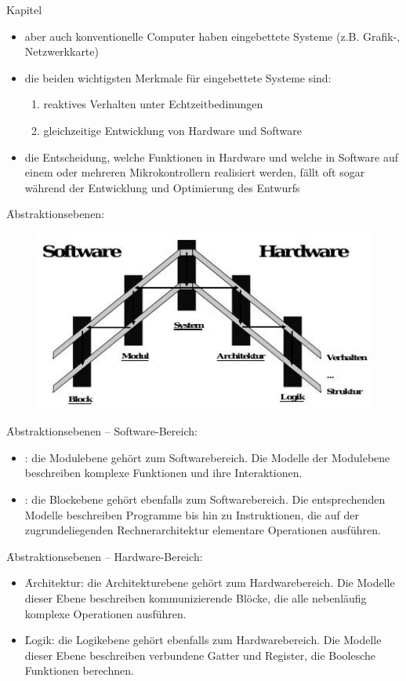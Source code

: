 \begin{chapter}{Kapitel}
\begin{itemize}
 \item aber auch konventionelle Computer haben eingebettete Systeme (z.B. Grafik-, Netzwerkkarte)
 \item die beiden wichtigsten Merkmale für eingebettete Systeme sind: 
 \begin{enumerate}
  \item reaktives Verhalten unter Echtzeitbedinungen
  \item gleichzeitige Entwicklung von Hardware und Software
 \end{enumerate}
 \item die Entscheidung, welche Funktionen in Hardware und welche in Software auf einem oder mehreren Mikrokontrollern realisiert werden, fällt oft sogar während 
 der Entwicklung und Optimierung des Entwurfs
\end{itemize}

\f{Abstraktionsebenen}:
\begin{figure}[!ht]
 \centering
 \includegraphics[scale=0.89]{pics/abstraktionsEbenen}
\end{figure}

\f{Abstraktionsebenen -- Software-Bereich}:
\begin{itemize}
 \item {}: die Modulebene gehört zum Softwarebereich. Die Modelle der Modulebene beschreiben komplexe Funktionen und ihre Interaktionen.
 \item {}: die Blockebene gehört ebenfalls zum Softwarebereich. Die entsprechenden Modelle beschreiben Programme bis hin zu Instruktionen, die auf der 
 zugrundeliegenden Rechnerarchitektur elementare Operationen ausführen.
\end{itemize}

\f{Abstraktionsebenen -- Hardware-Bereich}:
\begin{itemize}
 \item \f{Architektur}: die Architekturebene gehört zum Hardwarebereich. Die Modelle dieser Ebene beschreiben kommunizierende Blöcke, die alle nebenläufig 
 komplexe Operationen ausführen.
 \item \f{Logik}: die Logikebene gehört ebenfalls zum Hardwarebereich. Die Modelle dieser Ebene beschreiben verbundene Gatter und Register, die Boolesche 
 Funktionen berechnen.
\end{itemize}


\end{chapter}
